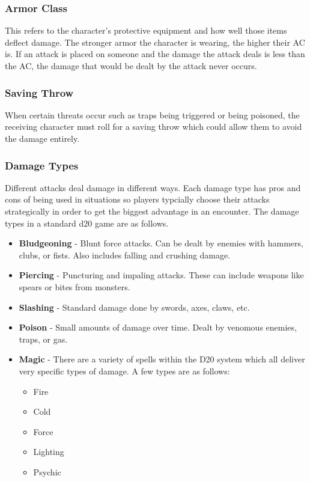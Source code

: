 \documentclass[12pt,a4paper]{report}
\begin{document}
		\subsubsection{Armor Class}
			This refers to the character's protective equipment and how well those items deflect damage. The stronger armor the character is wearing, the higher their AC is. If an attack is placed on someone and the damage the attack deals is less than the AC, the damage that would be dealt by the attack never occurs. 
		\subsubsection{Saving Throw}
			When certain threats occur such as traps being triggered or being poisoned, the receiving character must roll for a saving throw which could allow them to avoid the damage entirely.
		\subsubsection{Damage Types}
			Different attacks deal damage in different ways. Each damage type has pros and cons of being used in situations so players typcially choose their attacks strategically in order to get the biggest advantage in an encounter. The damage types in  a standard d20 game are as follows. 
		\begin{itemize}
			\item \textbf{Bludgeoning} - Blunt force attacks. Can be dealt by enemies with hammers, clubs, or fists. Also includes falling and crushing damage.
			\item \textbf{Piercing} - Puncturing and impaling attacks. These can include weapons like spears or bites from monsters.
			\item \textbf{Slashing} - Standard damage done by swords, axes, claws, etc.
			\item \textbf{Poison} - Small amounts of damage over time. Dealt by venomous enemies, traps, or gas.
			\item \textbf{Magic} - There are a variety of spells within the D20 system which all deliver very specific types of damage. A few types are as follows:
			\begin{itemize}
				\item Fire
				\item Cold
				\item Force
				\item Lighting
				\item Psychic
			\end{itemize}
		\end{itemize} 
\end{document}
